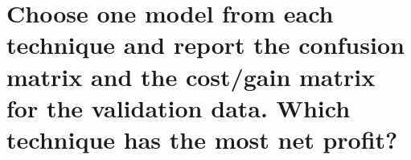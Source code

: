 \section{Choose one model from each technique and report the confusion matrix and the cost/gain matrix for the validation data. Which technique has the most net profit?} \label{appendix3}